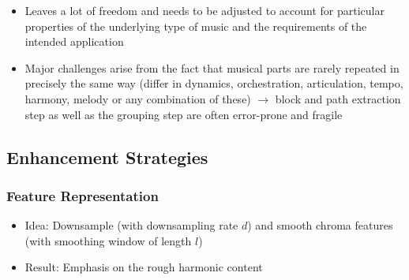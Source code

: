 \documentclass{scrartcl}
\begin{document}
\begin{itemize}
\begin{enumerate}
        \end{enumerate}
    \item
        Leaves a lot of freedom and needs to be adjusted to account for particular properties of the underlying type of music and the requirements of the intended application
    \item
        Major challenges arise from the fact that musical parts are rarely repeated in precisely the same way (differ in dynamics, orchestration, articulation, tempo, harmony, melody or any combination of these) $\rightarrow$ block and path extraction step as well as the grouping step are often error-prone and fragile
\end{itemize}

\subsection*{Enhancement Strategies}
\subsubsection*{Feature Representation}
\begin{itemize}
    \item
        Idea: Downsample (with downsampling rate $d$) and smooth chroma features (with smoothing window of length $l$)
    \item
        Result: Emphasis on the rough harmonic content
\end{itemize}
\end{document}
